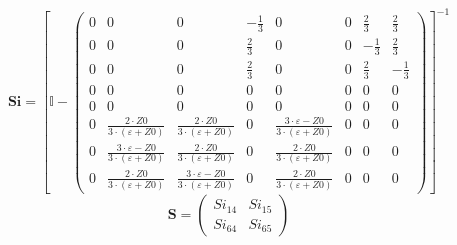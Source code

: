 \[ \mathbf{Si} = \left[ \mathbb{I}  - \left(\begin{array}{cccccccc} 0
& 0 & 0 & -\frac{1}{3} & 0 & 0 & \frac{2}{3} & \frac{2}{3} \\ 0 & 0 &
0 & \frac{2}{3} & 0 & 0 & -\frac{1}{3} & \frac{2}{3} \\ 0 & 0 & 0 &
\frac{2}{3} & 0 & 0 & \frac{2}{3} & -\frac{1}{3} \\ 0 & 0 & 0 & 0 & 0
& 0 & 0 & 0 \\ 0 & 0 & 0 & 0 & 0 & 0 & 0 & 0 \\ 0 & \frac{2\cdot
Z0}{3\cdot \left(\varepsilon+Z0\right)} & \frac{2\cdot Z0}{3\cdot
\left(\varepsilon+Z0\right)} & 0 & \frac{3\cdot \varepsilon-Z0}{3\cdot
\left(\varepsilon+Z0\right)} & 0 & 0 & 0 \\ 0 & \frac{3\cdot
\varepsilon-Z0}{3\cdot \left(\varepsilon+Z0\right)} & \frac{2\cdot
Z0}{3\cdot \left(\varepsilon+Z0\right)} & 0 & \frac{2\cdot Z0}{3\cdot
\left(\varepsilon+Z0\right)} & 0 & 0 & 0 \\ 0 & \frac{2\cdot
Z0}{3\cdot \left(\varepsilon+Z0\right)} & \frac{3\cdot
\varepsilon-Z0}{3\cdot \left(\varepsilon+Z0\right)} & 0 & \frac{2\cdot
Z0}{3\cdot \left(\varepsilon+Z0\right)} & 0 & 0 & 0 \end{array}\right)
\right]^{-1} \]
\[ \mathbf{S} = \left(\begin{array}{cc} Si_{14} & Si_{15} \\ Si_{64} &
Si_{65} \end{array}\right) \]
